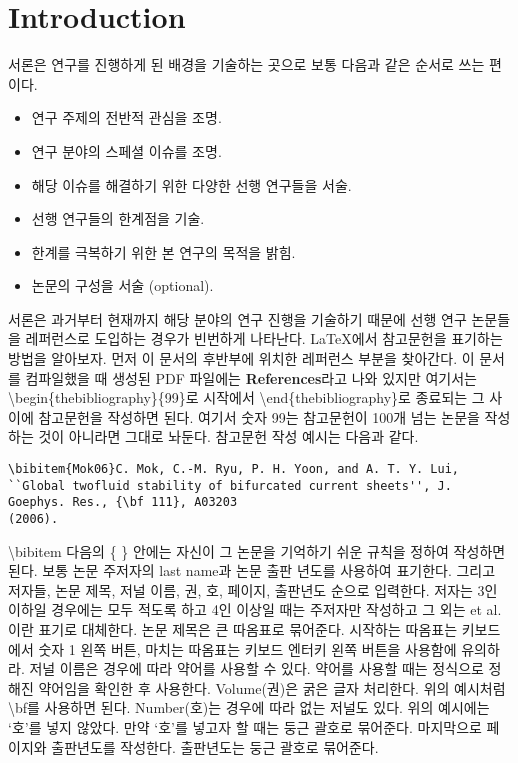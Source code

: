 \section{Introduction}

서론은 연구를 진행하게 된 배경을 기술하는 곳으로 보통 다음과 같은 순서로 쓰는 편이다.
\begin{itemize}
\item{연구 주제의 전반적 관심을 조명.}
\item{연구 분야의 스페셜 이슈를 조명.}
\item{해당 이슈를 해결하기 위한 다양한 선행 연구들을 서술.}
\item{선행 연구들의 한계점을 기술.}
\item{한계를 극복하기 위한 본 연구의 목적을 밝힘.}
\item{논문의 구성을 서술 (optional).}
\end{itemize}
서론은 과거부터 현재까지 해당 분야의 연구 진행을 기술하기 때문에 선행 연구 논문들을 레퍼런스로 도입하는 경우가 빈번하게 나타난다. \LaTeX 에서 참고문헌을 표기하는 방법을 알아보자. 먼저 이 문서의 후반부에 위치한 레퍼런스 부분을 찾아간다. 이 문서를 컴파일했을 때 생성된 PDF 파일에는 {\bf References}라고 나와 있지만 여기서는 {\textbackslash}begin\{thebibliography\}\{99\}로 시작에서 {\textbackslash}end\{thebibliography\}로 종료되는 그 사이에 참고문헌을 작성하면 된다. 여기서 숫자 99는 참고문헌이 100개 넘는 논문을 작성하는 것이 아니라면 그대로 놔둔다. 참고문헌 작성 예시는 다음과 같다.
\begin{lstlisting}
\bibitem{Mok06}C. Mok, C.-M. Ryu, P. H. Yoon, and A. T. Y. Lui, ``Global twofluid stability of bifurcated current sheets'', J. Goephys. Res., {\bf 111}, A03203
(2006).
\end{lstlisting}
{\textbackslash}bibitem 다음의 \{ \} 안에는 자신이 그 논문을 기억하기 쉬운 규칙을 정하여 작성하면 된다. 보통 논문 주저자의 last name과 논문 출판 년도를 사용하여 표기한다. 그리고 저자들, 논문 제목, 저널 이름, 권, 호, 페이지, 출판년도 순으로 입력한다. 저자는 3인 이하일 경우에는 모두 적도록 하고 4인 이상일 때는 주저자만 작성하고 그 외는 et al.이란 표기로 대체한다. 논문 제목은 큰 따옴표로 묶어준다.  시작하는 따옴표는 키보드에서 숫자 1 왼쪽 버튼, 마치는 따옴표는 키보드 엔터키 왼쪽 버튼을 사용함에 유의하라. 저널 이름은 경우에 따라 약어를 사용할 수 있다. 약어를 사용할 때는 정식으로 정해진 약어임을 확인한 후 사용한다. Volume(권)은 굵은 글자 처리한다. 위의 예시처럼 {\textbackslash}bf를 사용하면 된다. Number(호)는 경우에 따라 없는 저널도 있다. 위의 예시에는 `호'를 넣지 않았다. 만약 `호'를 넣고자 할 때는 둥근 괄호로 묶어준다. 마지막으로 페이지와 출판년도를 작성한다. 출판년도는 둥근 괄호로 묶어준다.

